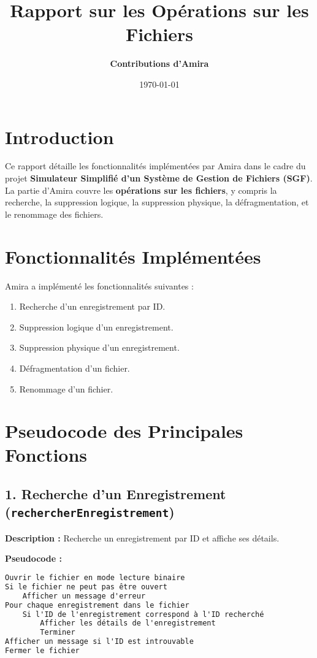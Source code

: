 \documentclass{article}
\title{\textbf{Rapport sur les Opérations sur les Fichiers}}
\author{\textbf{Contributions d'Amira}}
\date{\today}
\begin{document}
\maketitle

\section*{Introduction}
Ce rapport détaille les fonctionnalités implémentées par Amira dans le cadre du projet \textbf{Simulateur Simplifié d’un Système de Gestion de Fichiers (SGF)}. La partie d'Amira couvre les \textbf{opérations sur les fichiers}, y compris la recherche, la suppression logique, la suppression physique, la défragmentation, et le renommage des fichiers.

\section*{Fonctionnalités Implémentées}
Amira a implémenté les fonctionnalités suivantes :
\begin{enumerate}
    \item Recherche d'un enregistrement par ID.
    \item Suppression logique d'un enregistrement.
    \item Suppression physique d'un enregistrement.
    \item Défragmentation d'un fichier.
    \item Renommage d'un fichier.
\end{enumerate}

\section*{Pseudocode des Principales Fonctions}

\subsection*{1. Recherche d'un Enregistrement (\texttt{rechercherEnregistrement})}
\textbf{Description :} Recherche un enregistrement par ID et affiche ses détails.

\textbf{Pseudocode :}
\begin{lstlisting}[language=C, caption={Pseudocode pour \texttt{rechercherEnregistrement}}]
Ouvrir le fichier en mode lecture binaire
Si le fichier ne peut pas être ouvert
    Afficher un message d'erreur
Pour chaque enregistrement dans le fichier
    Si l'ID de l'enregistrement correspond à l'ID recherché
        Afficher les détails de l'enregistrement
        Terminer
Afficher un message si l'ID est introuvable
Fermer le fichier
\end{lstlisting}
\end{document}

